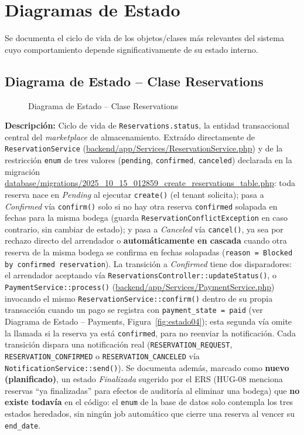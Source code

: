 \section{Diagramas de Estado}
\noindent Se documenta el ciclo de vida de los objetos/clases más relevantes del sistema cuyo comportamiento depende significativamente de su estado interno.

\subsection{Diagrama de Estado -- Clase Reservations}
\begin{figure}[H]
    \centering
    \caption{Diagrama de Estado -- Clase Reservations}
    \label{fig:estado01}
\end{figure}

{\sloppy\noindent\textbf{Descripción:} Ciclo de vida de \texttt{Reservations.status}, la entidad transaccional central del \textit{marketplace} de almacenamiento. Extraído directamente de \texttt{ReservationService} (\url{backend/app/Services/ReservationService.php}) y de la restricción \texttt{enum} de tres valores (\texttt{pending}, \texttt{confirmed}, \texttt{canceled}) declarada en la migración \url{database/migrations/2025_10_15_012859_create_reservations_table.php}: toda reserva nace en \emph{Pending} al ejecutar \texttt{create()} (el tenant solicita); pasa a \emph{Confirmed} vía \texttt{confirm()} solo si no hay otra reserva \texttt{confirmed} solapada en fechas para la misma bodega (guarda \texttt{ReservationConflictException} en caso contrario, sin cambiar de estado); y pasa a \emph{Canceled} vía \texttt{cancel()}, ya sea por rechazo directo del arrendador o \textbf{automáticamente en cascada} cuando otra reserva de la misma bodega se confirma en fechas solapadas (\texttt{reason = Blocked by confirmed reservation}). La transición a \emph{Confirmed} tiene dos disparadores: el arrendador aceptando vía \texttt{ReservationsController::updateStatus()}, o \texttt{PaymentService::process()} (\url{backend/app/Services/PaymentService.php}) invocando el mismo \texttt{ReservationService::confirm()} dentro de su propia transacción cuando un pago se registra con \texttt{payment\_state = paid} (ver Diagrama de Estado -- Payments, Figura~\ref{fig:estado04}); esta segunda vía omite la llamada si la reserva ya está \texttt{confirmed}, para no reenviar la notificación. Cada transición dispara una notificación real (\texttt{RESERVATION\_REQUEST}, \texttt{RESERVATION\_CONFIRMED} o \texttt{RESERVATION\_CANCELED} vía \texttt{NotificationService::send()}). Se documenta además, marcado como \textbf{nuevo (planificado)}, un estado \emph{Finalizada} sugerido por el ERS (HUG-08 menciona reservas ``ya finalizadas'' para efectos de auditoría al eliminar una bodega) que \textbf{no existe todavía} en el código: el \texttt{enum} de la base de datos solo contempla los tres estados heredados, sin ningún job automático que cierre una reserva al vencer su \texttt{end\_date}.\par}

